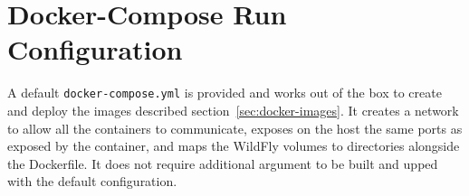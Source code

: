 \section{Docker-Compose Run Configuration}
A default \verb|docker-compose.yml| is provided and works out of the box to create and deploy the images described section~\ref{sec:docker-images}.
It creates a network to allow all the containers to communicate, exposes on the host the same ports as exposed by the container, and maps the WildFly volumes to directories alongside the Dockerfile.
It does not require additional argument to be built and upped with the default configuration.
